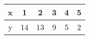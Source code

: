 \begin{tabular}[12pt]{ |c| c| c| c| c| c|}
    \hline
    x & 1 & 2 & 3 & 4 & 5 \\ 
    \hline
    y & 14 & 13 & 9 & 5 & 2 \\
    \hline   
    \end{tabular}
